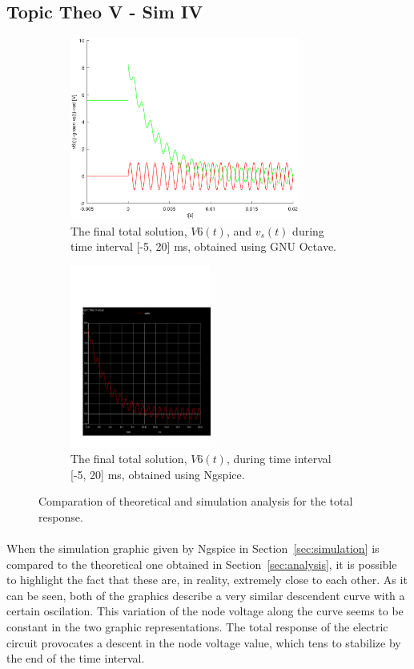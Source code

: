 \subsection{Topic Theo V - Sim IV}
\label{subsec:fourth_topic_error}

\begin{figure}[H]

\begin{subfigure}{0.5\textwidth}
\includegraphics[width=0.9\linewidth, height=6cm]{total.eps} 
\caption{The final total solution, $V6(t)$,  and $v_s(t)$ during time interval [-5, 20] ms, obtained using GNU Octave.}
\label{fig:theo_fifth}
\end{subfigure}
\begin{subfigure}{0.5\textwidth}
\includegraphics[width=0.9\linewidth, height=6cm]{trans2.pdf}
\caption{The final total solution, $V6(t)$, during time interval [-5, 20] ms, obtained using Ngspice.}
\label{fig:total}
\end{subfigure}

\caption{Comparation of theoretical and simulation analysis for the total response.}
\label{fig:compar_2}
\end{figure}

\paragraph{}
When the simulation graphic given by Ngspice in Section~\ref{sec:simulation} is compared to the theoretical one obtained in Section~\ref{sec:analysis}, it is possible to highlight the fact that these are, in reality, extremely close to each other. As it can be seen, both of the graphics describe a very similar descendent curve with a certain oscilation. This variation of the node voltage along the curve seems to be constant in the two graphic representations. The total response of the electric circuit provocates a descent in the node voltage value, which tens to stabilize by the end of the time interval.


